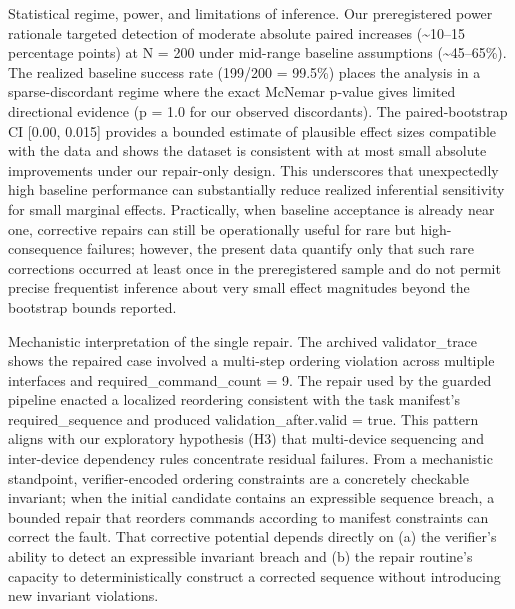 \documentclass[conference]{IEEEtran}
\begin{document}
Statistical regime, power, and limitations of inference. Our preregistered power rationale targeted detection of moderate absolute paired increases (\textasciitilde{}10--15 percentage points) at N = 200 under mid-range baseline assumptions (\textasciitilde{}45--65\%). The realized baseline success rate (199/200 = 99.5\%) places the analysis in a sparse-discordant regime where the exact McNemar p-value gives limited directional evidence (p = 1.0 for our observed discordants). The paired-bootstrap CI [0.00, 0.015] provides a bounded estimate of plausible effect sizes compatible with the data and shows the dataset is consistent with at most small absolute improvements under our repair-only design. This underscores that unexpectedly high baseline performance can substantially reduce realized inferential sensitivity for small marginal effects. Practically, when baseline acceptance is already near one, corrective repairs can still be operationally useful for rare but high-consequence failures; however, the present data quantify only that such rare corrections occurred at least once in the preregistered sample and do not permit precise frequentist inference about very small effect magnitudes beyond the bootstrap bounds reported.

Mechanistic interpretation of the single repair. The archived validator\_trace shows the repaired case involved a multi-step ordering violation across multiple interfaces and required\_command\_count = 9. The repair used by the guarded pipeline enacted a localized reordering consistent with the task manifest's required\_sequence and produced validation\_after.valid = true. This pattern aligns with our exploratory hypothesis (H3) that multi-device sequencing and inter-device dependency rules concentrate residual failures. From a mechanistic standpoint, verifier-encoded ordering constraints are a concretely checkable invariant; when the initial candidate contains an expressible sequence breach, a bounded repair that reorders commands according to manifest constraints can correct the fault. That corrective potential depends directly on (a) the verifier's ability to detect an expressible invariant breach and (b) the repair routine's capacity to deterministically construct a corrected sequence without introducing new invariant violations.
\end{document}
